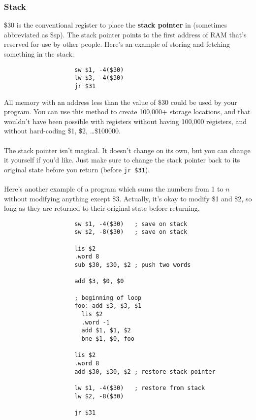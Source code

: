\documentclass[]{article}
\theoremstyle{definition}
\begin{document}
			\subsubsection{Stack}
				\$30 is the conventional register to place the \textbf{stack pointer} in (sometimes abbreviated as \$sp). The stack pointer points to the first address of RAM that's reserved for use by other people. Here's an example of storing and fetching something in the stack:
				\begin{verbatim}
					sw $1, -4($30)
					lw $3, -4($30)
					jr $31
				\end{verbatim}
				All memory with an address less than the value of \$30 could be used by your program. You can use this method to create 100,000+ storage locations, and that wouldn't have been possible with registers without having 100,000 registers, and without hard-coding \$1, \$2, \ldots \$100000.
				\\ \\
				The stack pointer isn't magical. It doesn't change on its own, but you can change it yourself if you'd like. Just make sure to change the stack pointer back to its original state before you return (before \verb+jr $31+).
				\\ \\
				Here's another example of a program which sums the numbers from 1 to $n$ without modifying anything except \$3. Actually, it's okay to modify \$1 and \$2, so long as they are returned to their original state before returning.
				\begin{verbatim}
					sw $1, -4($30)   ; save on stack
					sw $2, -8($30)   ; save on stack
					
					lis $2
					.word 8
					sub $30, $30, $2 ; push two words

					add $3, $0, $0

					; beginning of loop
					foo: add $3, $3, $1
					  lis $2
					  .word -1
					  add $1, $1, $2
					  bne $1, $0, foo

					lis $2
					.word 8
					add $30, $30, $2 ; restore stack pointer

					lw $1, -4($30)   ; restore from stack
					lw $2, -8($30)

					jr $31
				\end{verbatim}
\end{document}

